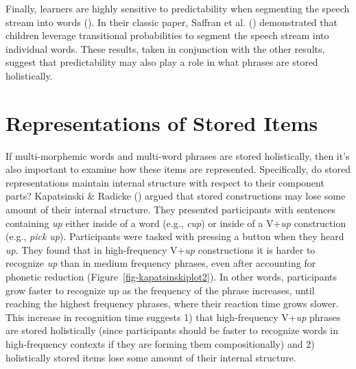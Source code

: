 \documentclass[
  12pt,
  letterpaper,
]{scrreport}
\begin{document}
Finally, learners are highly sensitive to predictability when segmenting
the speech stream into words
(). In their classic paper, Saffran et al.
()
demonstrated that children leverage transitional probabilities to
segment the speech stream into individual words. These results, taken in
conjunction with the other results, suggest that predictability may also
play a role in what phrases are stored holistically.

\section{Representations of Stored
Items}\label{sec-representations-of-stored-items}

If multi-morphemic words and multi-word phrases are stored holistically,
then it's also important to examine how these items are represented.
Specifically, do stored representations maintain internal structure with
respect to their component parts? Kapatsinski \& Radicke
() argued
that stored constructions may lose some amount of their internal
structure. They presented participants with sentences containing
\emph{up} either inside of a word (e.g., \emph{cup}) or inside of a
V+\emph{up} construction (e.g., \emph{pick up}). Participants were
tasked with pressing a button when they heard \emph{up}. They found that
in high-frequency V+\emph{up} constructions it is harder to recognize
\emph{up} than in medium frequency phrases, even after accounting for
phonetic reduction (Figure~\ref{fig-kapatsinskiplot2}). In other words,
participants grow faster to recognize up as the frequency of the phrase
increases, until reaching the highest frequency phrases, where their
reaction time grows slower. This increase in recognition time suggests
1) that high-frequency V+\emph{up} phrases are stored holistically
(since participants should be faster to recognize words in
high-frequency contexts if they are forming them compositionally) and 2)
holistically stored items lose some amount of their internal structure.
\end{document}
